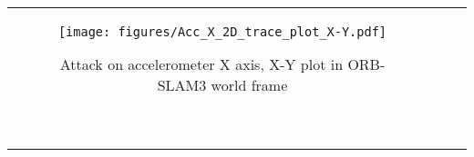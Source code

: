 \begin{figure*}[h]
    \centering
    \begin{tabular}{ccc}
        \begin{subfigure}[b]{0.32\textwidth}
            \centering
            \texttt{[image: figures/Acc\_X\_2D\_trace\_plot\_X-Y.pdf]}
            \caption{Attack on accelerometer X axis, X-Y plot in ORB-SLAM3 world frame}
            \label{subfig:orbslam_acc_constant_1}
        \end{subfigure}
        ~
        

\end{tabular}
\end{figure*}
